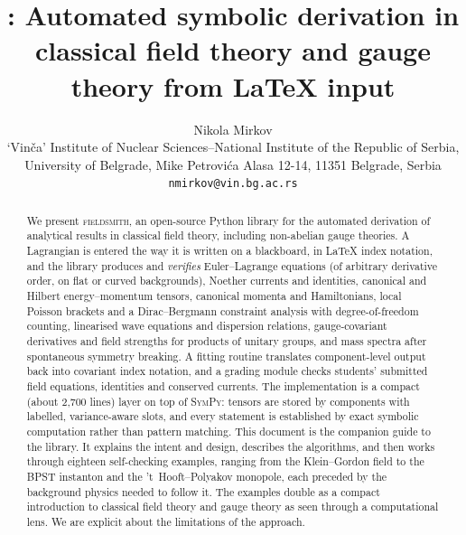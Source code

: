 \documentclass[11pt,a4paper]{article}
\title{\textbf{\fs{}: Automated symbolic derivation in classical field theory and gauge theory from \LaTeX{} input}} %
\author{Nikola Mirkov \\    
\small `Vin\v{c}a' Institute of Nuclear Sciences--National Institute of the Republic of Serbia,\\ \small University of Belgrade, Mike Petrovi\'{c}a Alasa 12-14, 11351 Belgrade, Serbia\\
\small \texttt{nmirkov@vin.bg.ac.rs}}
\date{}
\newcommand{\fs}{\textsc{fieldsmith}}
\theoremstyle{definition}
\theoremstyle{plain}
\newcounter{ex}
\begin{document}
\maketitle

\begin{abstract}
\noindent
We present \fs{}, an open-source Python library for the automated derivation of analytical results in classical field theory, including non-abelian gauge theories. A Lagrangian is entered the way it is written on a blackboard, in \LaTeX{} index notation, and the library produces and \emph{verifies} Euler--Lagrange equations (of arbitrary derivative order, on flat or curved backgrounds), Noether currents and identities, canonical and Hilbert energy--momentum tensors, canonical momenta and Hamiltonians, local Poisson brackets and a Dirac--Bergmann constraint analysis with degree-of-freedom counting, linearised wave equations and dispersion relations, gauge-covariant derivatives and field strengths for products of unitary groups, and mass spectra after spontaneous symmetry breaking. A fitting routine translates component-level output back into covariant index notation, and a grading module checks students' submitted field equations, identities and conserved currents. The implementation is a compact (about 2,700 lines) layer on top of \textsc{SymPy}: tensors are stored by components with labelled, variance-aware slots, and every statement is established by exact symbolic computation rather than pattern matching.
This document is the companion guide to the library. It explains the intent and design, describes the algorithms, and then works through eighteen self-checking examples, ranging from the Klein--Gordon field to the BPST instanton and the 't~Hooft--Polyakov monopole, each preceded by the background physics needed to follow it. The examples double as a compact introduction to classical field theory and gauge theory as seen through a computational lens. We are explicit about the limitations of the approach.
\end{abstract}

\tableofcontents
\clearpage











\appendix







\end{document}
